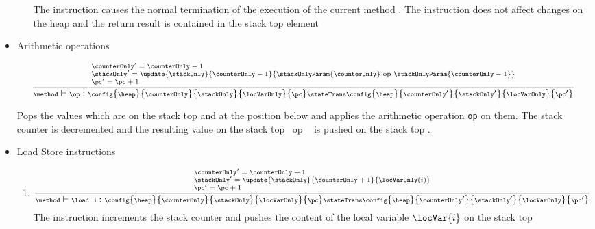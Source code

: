 \begin{itemize}
\begin{enumerate}
	    The instruction causes the normal termination of the execution of the current method \methodd.
	    The instruction does not affect changes on the heap \heap{} and the return result is contained in
	    the stack top element \stackOnlyParam{\counterOnly}
      \end{enumerate}

  \item Arithmetic operations 	
        
	   $${\scriptsize \frac{ 
	   \begin{array}{l}
	   \counterOnly' = \counterOnly - 1 \\
	   \stackOnly' = \update{\stackOnly} {\counterOnly-1}{\stackOnlyParam{\counterOnly} \ \rm{op} \ \stackOnlyParam{\counterOnly-1}} \\
	   \pc' = \pc + 1
	   \end{array}}
		   {\method \vdash  \op :\config{\heap}{\counterOnly}{\stackOnly}{\locVarOnly}{\pc} 
		          \stateTrans 
                          \config{\heap}{\counterOnly'}{\stackOnly' }{\locVarOnly}{\pc'} } } $$ 
		 
 
       Pops the values which are on the stack top \stackOnlyParam{\counterOnly}  and   at the position below and applies the arithmetic operation \texttt{op}
       on them. The stack counter is decremented and  the resulting  value on the stack top  \ \rm{op} \ \stackOnlyParam{\counterOnly} is pushed on the stack
       top  . 

  \item Load Store instructions

      \begin{enumerate}
    
	\item \load
	$${\scriptsize \frac{ \begin{array}{l}
	                \counterOnly' = \counterOnly + 1\\
			\stackOnly' = \update{\stackOnly}{\counterOnly +  1}{ \locVarOnly(i) } \\
			\pc' = \pc + 1
	          \end{array}
	    } 
	    {\method \vdash \load \ \mbox{ \rm i}  : \config{\heap}{\counterOnly}{\stackOnly}{\locVarOnly}{\pc} 
		  \stateTrans 
                  \config{\heap}{\counterOnly'}{\stackOnly'}{\locVarOnly}{\pc'}  } } $$ 
            The instruction increments the stack counter  \counterOnly and pushes
	    the content of the local variable $\locVar{i}$ on the stack top 
	    

\end{enumerate}
\end{itemize}
